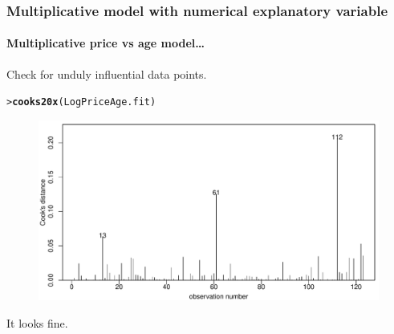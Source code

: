 \documentclass{beamer}\usepackage[]{graphicx}\usepackage[]{xcolor}
\makeatletter
\newcommand{\hlstd}[1]{\textcolor[rgb]{0.345,0.345,0.345}{#1}}%
\newcommand{\hlkwd}[1]{\textcolor[rgb]{0.737,0.353,0.396}{\textbf{#1}}}%
\newenvironment{kframe}{%
 \def\at@end@of@kframe{}%
 \ifinner\ifhmode%
  \def\at@end@of@kframe{\end{minipage}}%
  \begin{minipage}{\columnwidth}%
 \fi\fi%
 \def\FrameCommand##1{\hskip\@totalleftmargin \hskip-\fboxsep
 \colorbox{shadecolor}{##1}\hskip-\fboxsep
     \hskip-\linewidth \hskip-\@totalleftmargin \hskip\columnwidth}%
 \MakeFramed {\advance\hsize-\width
   \@totalleftmargin\z@ \linewidth\hsize
   \@setminipage}}%
 {\par\unskip\endMakeFramed%
 \at@end@of@kframe}
\newenvironment{knitrout}{}{} %
\makeatother
\begin{document}
\begin{frame}[fragile]
\frametitle{Multiplicative model with numerical explanatory variable}
\framesubtitle{Multiplicative price vs age model\ldots}
Check for unduly influential data points.
  
\begin{knitrout}\scriptsize
{}\color{fgcolor}\begin{kframe}
\begin{alltt}
\hlstd{> }\hlkwd{cooks20x}\hlstd{(LogPriceAge.fit)}
\end{alltt}
\end{kframe}
\end{knitrout}



\begin{figure}
  \centering
  \includegraphics[scale=0.5]{figure/RC-H06-033}
\end{figure}

It looks fine.
\end{frame}
\end{document}
